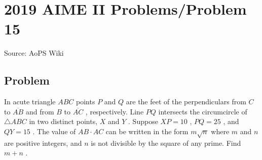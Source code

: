 \documentclass[12pt]{article}
\begin{document}
\section*{{2019 AIME II Problems/Problem 15}}
Source: AoPS Wiki

\subsection*{Problem}
In acute triangle $ABC$ points $P$ and $Q$ are the feet of the perpendiculars from $C$ to $\overline{AB}$ and from $B$ to $\overline{AC}$ , respectively. Line $PQ$ intersects the circumcircle of $\triangle ABC$ in two distinct points, $X$ and $Y$ . Suppose $XP=10$ , $PQ=25$ , and $QY=15$ . The value of $AB\cdot AC$ can be written in the form $m\sqrt n$ where $m$ and $n$ are positive integers, and $n$ is not divisible by the square of any prime. Find $m+n$ .
\end{document}
